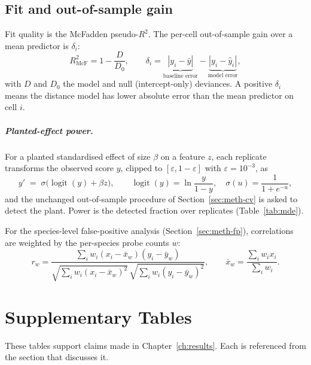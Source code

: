 \section{Fit and out-of-sample gain}
\label{app:stats}
Fit quality is the McFadden pseudo-$R^2$. The per-cell out-of-sample gain over a mean predictor is $\delta_i$:
\begin{equation}
  R^2_{\mathrm{McF}}=1-\frac{D}{D_0},
  \qquad
  \delta_i=\underbrace{|y_i-\bar y|}_{\text{baseline error}}-\underbrace{|y_i-\hat y_i|}_{\text{model error}},
\end{equation}
with $D$ and $D_0$ the model and null (intercept-only) deviances. A positive $\delta_i$ means the distance
model has lower absolute error than the mean predictor on cell $i$.

\paragraph{Planted-effect power.} For a planted standardised effect of size $\beta$ on a feature $z$, each
replicate transforms the observed score $y$, clipped to $[\varepsilon, 1-\varepsilon]$ with
$\varepsilon=10^{-3}$, as
\begin{equation}
  y' \;=\; \sigma\big(\operatorname{logit}(y) + \beta z\big),
  \qquad
  \operatorname{logit}(y)=\ln\frac{y}{1-y},
  \quad
  \sigma(u)=\frac{1}{1+e^{-u}},
  \label{eq:plant}
\end{equation}
and the unchanged out-of-sample procedure of Section~\ref{sec:meth-cv} is asked to detect the plant. Power is
the detected fraction over replicates (Table~\ref{tab:mde}).

For the species-level false-positive analysis (Section~\ref{sec:meth-fp}), correlations are weighted by the
per-species probe counts $w$:
\begin{equation}
  r_w=\frac{\sum_i w_i (x_i-\bar x_w)(y_i-\bar y_w)}
           {\sqrt{\sum_i w_i (x_i-\bar x_w)^2}\,\sqrt{\sum_i w_i (y_i-\bar y_w)^2}},
  \qquad \bar x_w=\frac{\sum_i w_i x_i}{\sum_i w_i}.
\end{equation}

\chapter{Supplementary Tables}
\label{app:supplementary}
These tables support claims made in Chapter~\ref{ch:results}. Each is referenced from the section that
discusses it.


